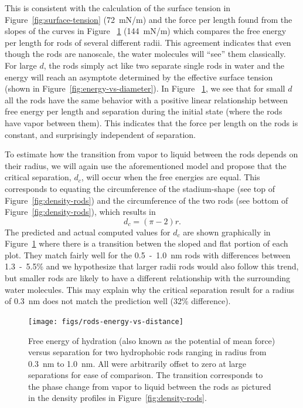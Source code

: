\documentclass[letterpaper,twocolumn,amsmath,amssymb,prb]{revtex4-1}
\begin{document}
This is consistent with the calculation of the surface tension in
Figure~\ref{fig:surface-tension} (72~mN/m) and the force per length
found from the slopes of the curves in Figure
~\ref{fig:rods-energy-vs-distance} (144~mN/m)  which
compares the free energy per length for rods of several different
radii. This agreement indicates that even though the rods are nanoscale, the
water molecules will ``see'' them classically.  For large $d$, the rods 
simply act like two separate single rods in water and the energy will
reach an asymptote determined by the effective surface tension (shown in 
Figure~\ref{fig:energy-vs-diameter}). In Figure
~\ref{fig:rods-energy-vs-distance}, we see that for small $d$ all the rods 
have the same behavior with a positive linear relationship
between free energy per length and separation during the initial state 
(where the rods have vapor between them). This indicates that the force 
per length on the rods is constant, and surprisingly independent of separation.

To estimate how the transition from vapor to liquid between the rods depends on their 
radius, we will again use the aforementioned model and propose that 
the critical separation, $d_c$, will occur when the free energies are equal. This 
corresponds to equating the circumference of the stadium-shape (see 
top of Figure~\ref{fig:density-rods}) and the circumference of the two rods (see bottom
of Figure~\ref{fig:density-rods}), which results in
\begin{equation}
d_c = (\pi-2)r.\label{criticalseparation}
\end{equation}
The predicted and actual computed values for $d_c$ are shown graphically in 
Figure~\ref{fig:rods-energy-vs-distance} where there is a transition
betwen the sloped and flat portion of each plot. They match fairly well for the 
0.5~-~1.0~nm rods with differences between 1.3~-~5.5\% and we hypothesize that larger radii rods
would also follow this trend, but smaller rods are likely to have a different
relationship with the surrounding water molecules. This may explain why the critical
separation result for a radius of 0.3~nm does not match the prediction
well (32\% difference).

\begin{figure}
\begin{center}
\texttt{[image: figs/rods-energy-vs-distance]}
\end{center}
\caption{ Free energy of hydration (also known as the potential of mean force) 
versus separation for two hydrophobic rods ranging in radius from
0.3~nm to 1.0~nm.
All were arbitrarily offset to zero at large separations for ease of comparison. The
transition corresponds to the phase change from
vapor to liquid between the rods as pictured in the density profiles in 
Figure~\ref{fig:density-rods}. }
\label{fig:rods-energy-vs-distance}
\end{figure}
\end{document}
